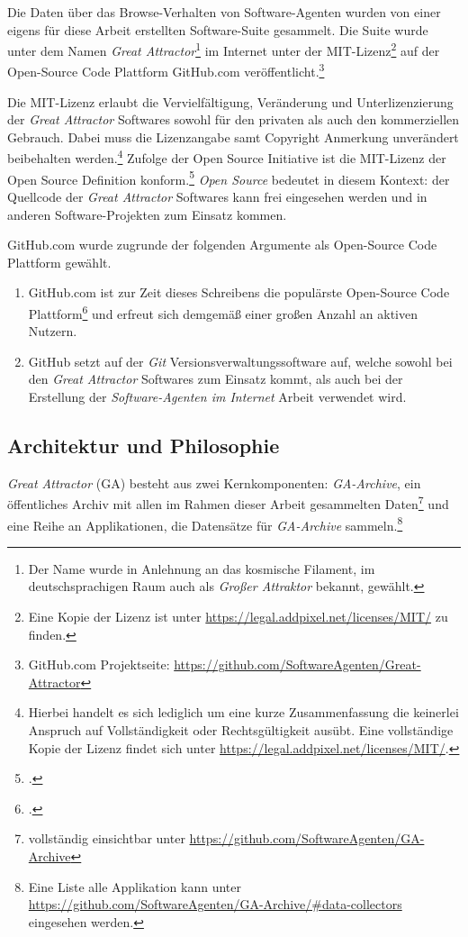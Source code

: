 \label{topic:great-attractor}
Die Daten über das Browse-Verhalten von Software-Agenten wurden von einer
eigens für diese Arbeit erstellten Software-Suite gesammelt. Die Suite wurde
unter dem Namen \emph{Great Attractor}\footnote{Der Name wurde in Anlehnung an
das kosmische Filament, im deutschsprachigen Raum auch als \emph{Großer
Attraktor} bekannt, gewählt.} im Internet unter der MIT-Lizenz\footnote{Eine
Kopie der Lizenz ist unter \url{https://legal.addpixel.net/licenses/MIT/} zu
finden.} auf der Open-Source Code Plattform GitHub.com
veröffentlicht.\footnote{GitHub.com Projektseite:
\url{https://github.com/SoftwareAgenten/Great-Attractor}}

Die MIT-Lizenz erlaubt die Vervielfältigung, Veränderung und Unterlizenzierung
der \emph{Great Attractor} Softwares sowohl für den privaten als auch den
kommerziellen Gebrauch. Dabei muss die Lizenzangabe samt Copyright Anmerkung
unverändert beibehalten werden.\footnote{Hierbei handelt es sich lediglich um
eine kurze Zusammenfassung die keinerlei Anspruch auf Vollständigkeit oder
Rechtsgültigkeit ausübt. Eine vollständige Kopie der Lizenz findet sich unter
\url{https://legal.addpixel.net/licenses/MIT/}.} Zufolge der Open Source
Initiative ist die MIT-Lizenz der Open Source Definition
konform.\footcite{license:MIT} \emph{Open Source} bedeutet in diesem Kontext:
der Quellcode der \emph{Great Attractor} Softwares kann frei eingesehen werden
und in anderen Software-Projekten zum Einsatz kommen.

GitHub.com wurde zugrunde der folgenden Argumente als Open-Source Code
Plattform gewählt.

\begin{enumerate}
\item
  GitHub.com ist zur Zeit dieses Schreibens die populärste Open-Source Code
  Plattform\footcite{githubPop} und erfreut sich demgemäß einer großen Anzahl an
  aktiven Nutzern.
\item
  GitHub setzt auf der \emph{Git} Versionsverwaltungssoftware auf, welche sowohl
  bei den \emph{Great Attractor} Softwares zum Einsatz kommt, als auch bei der
  Erstellung der \emph{Software-Agenten im Internet} Arbeit verwendet wird.
\end{enumerate}

\subsection{Architektur und Philosophie}
\label{sub:architektur_und_philosophie} \emph{Great Attractor} (GA) besteht aus
zwei Kernkomponenten: \emph{GA-Archive}, ein öffentliches Archiv mit allen im
Rahmen dieser Arbeit gesammelten Daten\footnote{vollständig einsichtbar unter
\url{https://github.com/SoftwareAgenten/GA-Archive}} und eine Reihe an
Applikationen, die Datensätze für \emph{GA-Archive} sammeln.\footnote{Eine
Liste alle Applikation kann unter
\url{https://github.com/SoftwareAgenten/GA-Archive/\#data-collectors}
eingesehen werden.}

